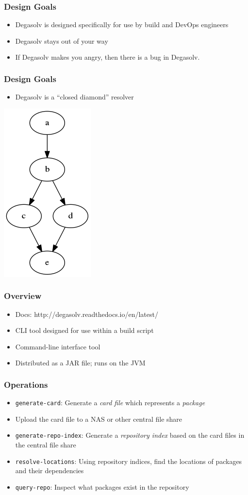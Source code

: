\documentclass{beamer}
\begin{document}
\begin{frame}
  \frametitle{Design Goals}
  \begin{itemize}
  \item Degasolv is designed specifically for use by build and DevOps engineers
  \item Degasolv stays out of your way
  \item If Degasolv makes you angry, then there is a bug in Degasolv.
  \end{itemize}
\end{frame}
\begin{frame}
    \frametitle{Design Goals}
    \begin{itemize}
  \item Degasolv is a ``closed diamond'' resolver
    \end{itemize}
  \centerline{\includegraphics[scale=0.5]{diamonddep.png}}
\end{frame}
\begin{frame}
  \frametitle{Overview}
  \begin{itemize}
  \item Docs: {\small http://degasolv.readthedocs.io/en/latest/}
  \item CLI tool designed for use within a build script
  \item Command-line interface tool
  \item Distributed as a JAR file; runs on the JVM
  \end{itemize}
\end{frame}
\begin{frame}
  \frametitle{Operations}
  \begin{itemize}
      \item \texttt{generate-card}: Generate a \textit{card file} which
          represents a \textit{package}
  \item Upload the card file to a NAS or other central file share
  \item \texttt{generate-repo-index}: Generate a \textit{repository index}
    based on the card files in the central file share
  \item \texttt{resolve-locations}: Using repository indices, find the
      locations of packages and their dependencies
  \item \texttt{query-repo}: Inspect what packages exist in the repository
  \end{itemize}
\end{frame}
\end{document}
